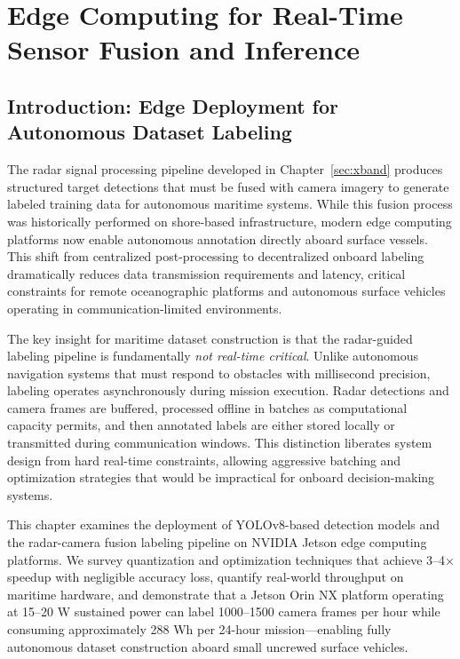 \section{Edge Computing for Real-Time Sensor Fusion and Inference}
\label{sec:edge}

\subsection{Introduction: Edge Deployment for Autonomous Dataset Labeling}

The radar signal processing pipeline developed in Chapter~\ref{sec:xband} produces structured target detections that must be fused with camera imagery to generate labeled training data for autonomous maritime systems. While this fusion process was historically performed on shore-based infrastructure, modern edge computing platforms now enable autonomous annotation directly aboard surface vessels. This shift from centralized post-processing to decentralized onboard labeling dramatically reduces data transmission requirements and latency, critical constraints for remote oceanographic platforms and autonomous surface vehicles operating in communication-limited environments.

The key insight for maritime dataset construction is that the radar-guided labeling pipeline is fundamentally \emph{not real-time critical}. Unlike autonomous navigation systems that must respond to obstacles with millisecond precision, labeling operates asynchronously during mission execution. Radar detections and camera frames are buffered, processed offline in batches as computational capacity permits, and then annotated labels are either stored locally or transmitted during communication windows. This distinction liberates system design from hard real-time constraints, allowing aggressive batching and optimization strategies that would be impractical for onboard decision-making systems.

This chapter examines the deployment of YOLOv8-based detection models and the radar-camera fusion labeling pipeline on NVIDIA Jetson edge computing platforms. We survey quantization and optimization techniques that achieve 3--4× speedup with negligible accuracy loss, quantify real-world throughput on maritime hardware, and demonstrate that a Jetson Orin NX platform operating at 15--20 W sustained power can label 1000--1500 camera frames per hour while consuming approximately 288 Wh per 24-hour mission---enabling fully autonomous dataset construction aboard small uncrewed surface vehicles.

